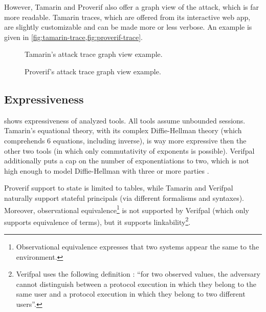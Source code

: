 \begin{figure}[t]
    \centering
    \caption{}
    \label{fig:attack-trace}
\end{figure}

However, Tamarin and Proverif also offer a graph view of the attack, which is far more readable. Tamarin traces, which are offered from its interactive web app, are slightly customizable and can be made more or less verbose. An example is given in \cref{fig:tamarin-trace,fig:proverif-trace}.


\begin{figure}[t]
    \centering
    \caption{Tamarin's attack trace graph view example.}
    \label{fig:tamarin-trace}
\end{figure}
\begin{figure}[t]
    \centering
    \caption{Proverif's attack trace graph view example.}
    \label{fig:proverif-trace}
\end{figure}


\subsection{Expressiveness}
 shows expressiveness of analyzed tools.
All tools assume unbounded sessions. Tamarin's equational theory, with its complex Diffie-Hellman theory (which comprehends 6 equations, including inverse), is way more expressive then the other two tools (in which only commutativity of exponents is possible). Verifpal additionally puts a cap on the number of exponentiations to two, which is not high enough to model Diffie-Hellman with three or more parties \cite{MultipartyDH}.

Proverif support to state is limited to tables, while Tamarin and Verifpal naturally support stateful principals (via different formalisms and syntaxes). Moreover, observational equivalence\footnote{Observational equivalence expresses that two systems appear the same to the environment.} is not supported by Verifpal (which only supports equivalence of terms), but it supports linkability\footnote{Verifpal uses the following definition \cite{VerifpalFoundations}: ``for two
    observed values, the adversary cannot distinguish between a protocol execution in
    which they belong to the same user and a protocol execution in which they belong to
    two different users''.}.

